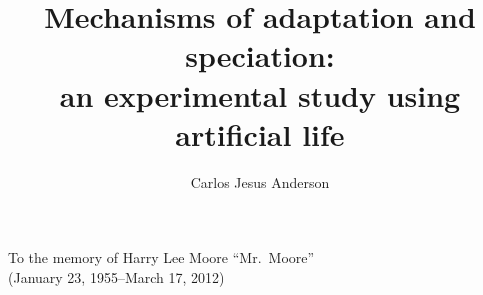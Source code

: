 \documentclass{msuphddissertation}
\title{Mechanisms of adaptation and speciation:\protect\\
  an experimental study using artificial life}
\author{Carlos Jesus Anderson}
\begin{document}
\maketitlepage



\begin{copyrt}
\centering
\end{copyrt}

\begin{dedication} 
\centering To the memory of Harry Lee Moore ``Mr.\ Moore''\\
  (January 23, 1955--March 17, 2012)
\end{dedication}



\TOC
\LOT
\LOF

\newpage
{}










\end{document}
